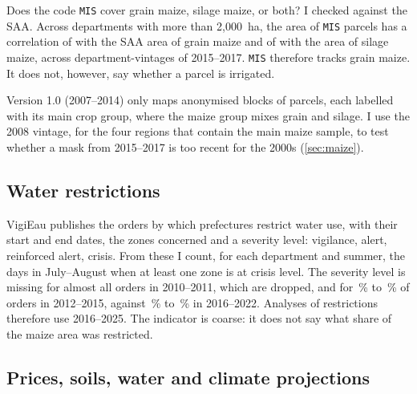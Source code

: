 Does the code \texttt{MIS} cover grain maize, silage maize, or both? I checked against the SAA. Across departments with more than 2,000~ha, the area of \texttt{MIS} parcels has a correlation of \MaskCorrGrain{} with the SAA area of grain maize and of \MaskCorrFodder{} with the area of silage maize, across department-vintages of 2015--2017. \texttt{MIS} therefore tracks grain maize. It does not, however, say whether a parcel is irrigated.

Version 1.0 (2007--2014) only maps anonymised blocks of parcels, each labelled with its main crop group, where the maize group mixes grain and silage. I use the 2008 vintage, for the four regions that contain the main maize sample, to test whether a mask from 2015--2017 is too recent for the 2000s (\cref{sec:maize}).

\subsection{Water restrictions}

VigiEau publishes the orders by which prefectures restrict water use, with their start and end dates, the zones concerned and a severity level: vigilance, alert, reinforced alert, crisis. From these I count, for each department and summer, the days in July--August when at least one zone is at crisis level. The severity level is missing for almost all orders in 2010--2011, which are dropped, and for \VigiMissEarlyMin\,\% to \VigiMissEarlyMax\,\% of orders in 2012--2015, against \VigiMissMidMin\,\% to \VigiMissMidMax\,\% in 2016--2022. Analyses of restrictions therefore use 2016--2025. The indicator is coarse: it does not say what share of the maize area was restricted.

\subsection{Prices, soils, water and climate projections}

